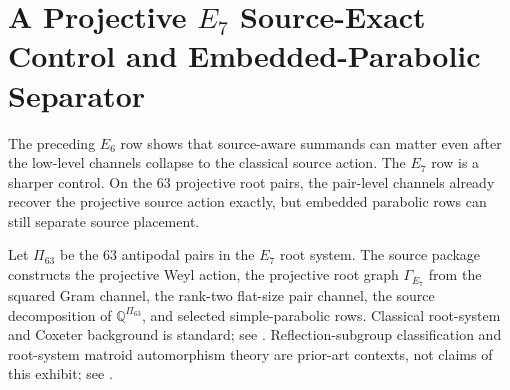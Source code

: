 \section{A Projective \texorpdfstring{\(E_7\)}{E7} Source-Exact Control and Embedded-Parabolic Separator}
\label{sec:e7-root-shadow-control}

The preceding \(E_6\) row shows that source-aware summands can matter even after the low-level channels collapse to the classical source action.  The \(E_7\) row is a sharper control.  On the 63 projective root pairs, the pair-level channels already recover the projective source action exactly, but embedded parabolic rows can still separate source placement.

Let \(\Pi_{63}\) be the 63 antipodal pairs in the \(E_7\) root system.  The source package constructs the projective Weyl action, the projective root graph \(\Gamma_{E_7}\) from the squared Gram channel, the rank-two flat-size pair channel, the source decomposition of \(\mathbb Q^{\Pi_{63}}\), and selected simple-parabolic rows.  Classical root-system and Coxeter background is standard; see \cite{BjornerBrenti2005}.  Reflection-subgroup classification and root-system matroid automorphism theory are prior-art contexts, not claims of this exhibit; see \cite{DyerLehrer2010ReflectionSubgroups,DutourSikiricFeliksonTumarkin2008RootMatroids}.

